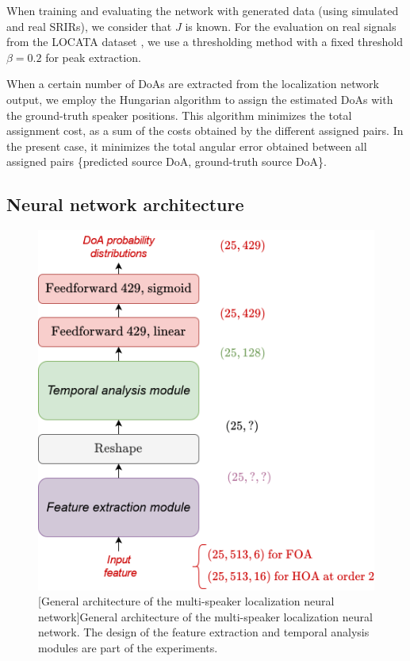 When training and evaluating the network with generated data (using simulated and real SRIRs), we consider that $J$ is known. For the evaluation on real signals from the LOCATA dataset \cite{evers_locata_2020}, we use a thresholding method with a fixed threshold $\beta = 0.2$ for peak extraction.

When a certain number of DoAs are extracted from the localization network output, we employ the Hungarian algorithm \cite{kuhn_hungarian_1955} to assign the estimated DoAs with the ground-truth speaker positions. This algorithm minimizes the total assignment cost, as a sum of the costs obtained by the different assigned pairs. In the present case, it minimizes the total angular error obtained between all assigned pairs \{predicted source DoA, ground-truth source DoA\}.

\subsection{Neural network architecture}

\begin{figure}[ht]
    \begin{center}
    \includegraphics[width=0.7\linewidth]{Images/chap7/generalMultiLocalizationNetwork.png}
    [General architecture of the multi-speaker localization neural network]{General architecture of the multi-speaker localization neural network. The design of the feature extraction and temporal analysis modules are part of the experiments.}
    \label{fig:generalMultiLocalizationNetwork}
    \end{center}
\end{figure}

